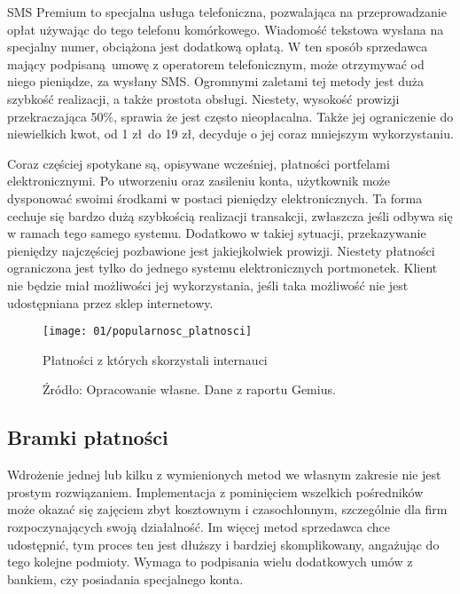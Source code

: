 SMS Premium to specjalna usługa telefoniczna, pozwalająca na przeprowadzanie opłat używając do tego telefonu komórkowego. Wiadomość tekstowa wysłana na specjalny numer, obciążona jest dodatkową opłatą. W ten sposób sprzedawca mający podpisaną umowę z operatorem telefonicznym, może otrzymywać od niego pieniądze, za wysłany SMS. Ogromnymi zaletami tej metody jest duża szybkość realizacji, a także prostota obsługi. Niestety, wysokość prowizji przekraczająca 50\%, sprawia że jest często nieopłacalna. Także jej ograniczenie do niewielkich kwot, od 1 zł do 19 zł, decyduje o jej coraz mniejszym wykorzystaniu.

Coraz częściej spotykane są, opisywane wcześniej, płatności portfelami elektronicznymi. Po utworzeniu oraz zasileniu konta, użytkownik może dysponować swoimi środkami w postaci pieniędzy elektronicznych. Ta forma cechuje się bardzo dużą szybkością realizacji transakcji, zwłaszcza jeśli odbywa się w ramach tego samego systemu. Dodatkowo w takiej sytuacji, przekazywanie pieniędzy najczęściej pozbawione jest jakiejkolwiek prowizji. Niestety płatności ograniczona jest tylko do jednego systemu elektronicznych portmonetek. Klient nie będzie miał możliwości jej wykorzystania, jeśli taka możliwość nie jest udostępniana przez sklep internetowy.

\begin{figure}[h]
	\begin{center}
		\texttt{[image: 01/popularnosc\_platnosci]}
	\end{center}
	\caption{Płatności z których skorzystali internauci}
	\vspace{-0.4cm}
	\caption*{Źródło: Opracowanie własne. Dane z raportu Gemius. \cite{raport-ecommerce2014}}
\end{figure}

\subsection{Bramki płatności}
Wdrożenie jednej lub kilku z wymienionych metod we własnym zakresie nie jest prostym rozwiązaniem. Implementacja z pominięciem wszelkich pośredników może okazać się zajęciem zbyt kosztownym i czasochłonnym, szczególnie dla firm rozpoczynających swoją działalność. Im więcej metod sprzedawca chce udostępnić, tym proces ten jest dłuższy i bardziej skomplikowany, angażując do tego kolejne podmioty. Wymaga to podpisania wielu dodatkowych umów z bankiem, czy posiadania specjalnego konta. 

